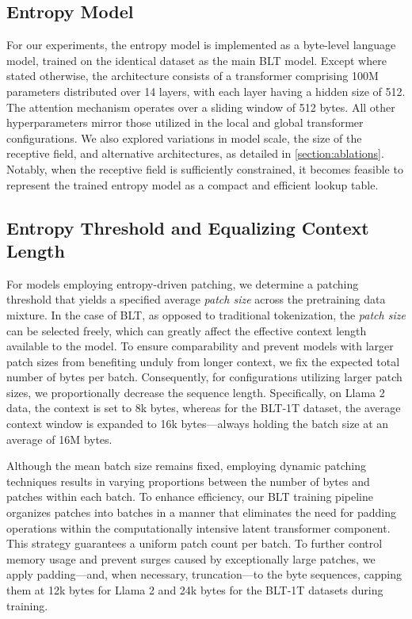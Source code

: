 \subsection{Entropy Model} For our experiments, the entropy model is implemented as a byte-level language model, trained on the identical dataset as the main {\textsc BLT} model. Except where stated otherwise, the architecture consists of a transformer comprising 100M parameters distributed over 14 layers, with each layer having a hidden size of 512. The attention mechanism operates over a sliding window of 512 bytes. All other hyperparameters mirror those utilized in the local and global transformer configurations. We also explored variations in model scale, the size of the receptive field, and alternative architectures, as detailed in \autoref{section:ablations}. Notably, when the receptive field is sufficiently constrained, it becomes feasible to represent the trained entropy model as a compact and efficient lookup table.

\subsection{Entropy Threshold and Equalizing Context Length} For models employing entropy-driven patching, we determine a patching threshold that yields a specified average \textit{patch size} across the pretraining data mixture. In the case of {\textsc BLT}, as opposed to traditional tokenization, the \textit{patch size} can be selected freely, which can greatly affect the effective context length available to the model. To ensure comparability and prevent models with larger patch sizes from benefiting unduly from longer context, we fix the expected total number of bytes per batch. Consequently, for configurations utilizing larger patch sizes, we proportionally decrease the sequence length. Specifically, on Llama 2 data, the context is set to 8k bytes, whereas for the {\textsc BLT}-1T dataset, the average context window is expanded to 16k bytes—always holding the batch size at an average of 16M bytes.

Although the mean batch size remains fixed, employing dynamic patching techniques results in varying proportions between the number of bytes and patches within each batch. To enhance efficiency, our {\textsc BLT} training pipeline organizes patches into batches in a manner that eliminates the need for padding operations within the computationally intensive latent transformer component. This strategy guarantees a uniform patch count per batch. To further control memory usage and prevent surges caused by exceptionally large patches, we apply padding—and, when necessary, truncation—to the byte sequences, capping them at 12k bytes for Llama 2 and 24k bytes for the {\textsc BLT}-1T datasets during training.

